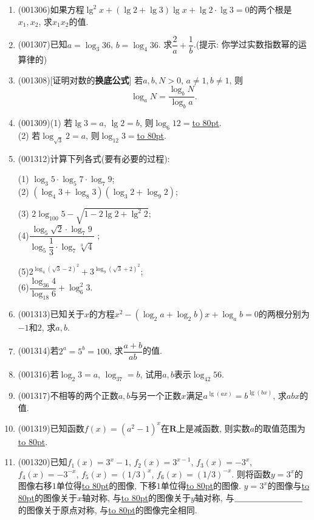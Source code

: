 \documentclass[10pt,a4paper]{article}
\newcommand{\blank}[1]{\underline{\hbox to #1pt{}}}
\begin{document}
\begin{enumerate}[1.]
\item {\tiny (001306)}如果方程$\lg^2x+(\lg2+\lg3)\lg x+\lg2\cdot\lg3=0$的两个根是$x_1,x_2$, 求$x_1x_2$的值.
\item {\tiny (001307)}已知$a=\log_3 36$, $b=\log_4 36$. 求$\dfrac{2}{a}+\dfrac{1}{b}$.(提示: 你学过实数指数幂的运算律的)
\item {\tiny (001308)}[证明对数的{\bf 换底公式}]
若$a,b,N>0$, $a\ne 1, b\ne 1$, 则
$$\log_aN=\dfrac{\log_b N}{\log_b a}.$$
\item {\tiny (001309)}(1) 若$\lg 3=a$, $\lg 2=b$, 则$\log_6 12=$\blank{80}.\\ 
(2) 若$\log_{\sqrt{3}} 2=a$, 则$\log_{12} 3=$\blank{80}.
\item {\tiny (001312)}计算下列各式(要有必要的过程):\\ 
\begin{multicols}{2}
(1) $\log_3 5\cdot\log_5 7\cdot\log_7 9$; \\ 
(2) $(\log_4 3+\log_8 3)(\log_3 2+\log_9 2)$;\\ 
\end{multicols}
\begin{multicols}{2}
(3) $2\log_{100} 5-\sqrt{1-2\lg2+\lg^2 2}$; \\ 
(4)$\dfrac{\log_5 \sqrt{2}\cdot\log_7 9}{\log_5\dfrac{1}{3}\cdot\log_7\sqrt[3]{4}}$ ;
\end{multicols}
\begin{multicols}{2}
(5)$2^{\log_4(\sqrt{3}-2)^2}+3^{\log_9(\sqrt{3}+2)^2}$;  \\ 
(6)$\dfrac{\log_{36}4}{\log_{18}6}+\log_6^2 3$.\\ 
\end{multicols}
\item {\tiny (001313)}已知关于$x$的方程$x^2-(\log_2 a+\log_2 b)x+\log_a b=0$的两根分别为$-1$和$2$, 求$a,b$.
\item {\tiny (001314)}若$2^a=5^b=100$, 求$\dfrac{a+b}{ab}$的值.
\item {\tiny (001316)}若$\log_2 3=a$, $\log_37=b$, 试用$a,b$表示$\log_{42} 56$.
\item {\tiny (001317)}不相等的两个正数$a,b$与另一个正数$x$满足$a^{\lg(ax)}=b^{\lg(bx)}$, 求$abx$的值.
\item {\tiny (001319)}已知函数$f(x)=(a^2-1)^x$在$\mathbf{R}$上是减函数, 则实数$a$的取值范围为\blank{80}.
\item {\tiny (001320)}已知$f_1(x)=3^x-1$, $f_2(x)=3^{x-1}$, $f_3(x)=-3^x$, $f_4(x)=-3^{-x}$, $f_5(x)=(1/3)^x$, $f_6(x)=(1/3)^{-x}$. 则将函数$y=3^x$的图像右移$1$单位得\blank{80}的图像, 下移$1$单位得\blank{80}的图像. $y=3^x$的图像与\blank{80}的图像关于$x$轴对称, 与\blank{80}的图像关于$y$轴对称, 与$\blank{80}$的图像关于原点对称, 与\blank{80}的图像完全相同.

\end{enumerate}
\end{document}
